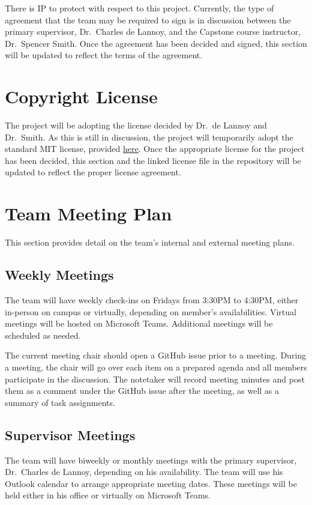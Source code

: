 \documentclass{article}
\begin{document}
There is IP to protect with respect to this project. Currently, the type of
agreement that the team may be required to sign is in discussion between the
primary supervisor, Dr.\ Charles de Lannoy, and the Capstone course instructor,
Dr.\ Spencer Smith. Once the agreement has been decided and signed, this section
will be updated to reflect the terms of the agreement.

\section{Copyright License}

The project will be adopting the license decided by Dr.\ de Lannoy and Dr.\ Smith. As this is
still in discussion, the project will temporarily adopt the standard MIT license, provided
\href{https://github.com/SumanyaG/Alkalytics/blob/main/LICENSE}{here}. Once the appropriate license for the project has been decided, this section and the linked
license file in the repository will be updated to reflect the proper license
agreement.

\section{Team Meeting Plan}
This section provides detail on the team's internal and external meeting plans.
\subsection{Weekly Meetings}
The team will have weekly check-ins on Fridays from 3:30PM to 4:30PM, either in-person 
on campus or virtually, depending on member's availabilities. Virtual meetings 
will be hosted on Microsoft Teams. Additional meetings will be scheduled as needed.\newline

\noindent The current meeting chair should open a GitHub issue prior to a meeting. During a 
meeting, the chair will go over each item on a prepared agenda and all members 
participate in the discussion. The notetaker will record meeting minutes and post 
them as a comment under the GitHub issue after the meeting, as well as a summary of
task assignments.

\subsection{Supervisor Meetings}
The team will have biweekly or monthly meetings with the primary supervisor, Dr.\ Charles
de Lannoy, depending on his availability. The team will use his Outlook calendar to
arrange appropriate meeting dates. These meetings will be held either in his
office or virtually on Microsoft Teams.\newline
\end{document}
